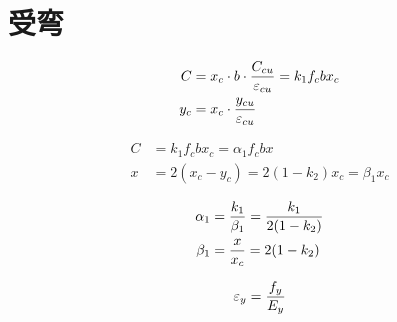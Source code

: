\begin{comment}
    \formDesc{基本组合}
    \begin{subequations}
        {\em 可变作用控制的情况:}
        \begin{equation}
            S_d = \gamma_GS_{Gk} + \gamma_{Q1}S_{Q1k} + \sum_{i = 2}^n\,\gamma_{Qi}\psi_{ci}S_{Qik}
        \end{equation}
        {\em 永久作用控制的情况:}
        \begin{equation}
            S_d = \gamma_GS_{Gk} + \sum_{i = 1}^n\,\gamma_{Qi}\psi_{ci}S_{Qik}
        \end{equation}
        \begin{description}\baselineskip=.8em
            \item{$S_{Gk}$、$\gamma_G$} 永久作用及其分项系数
            \item{$S_{Q1k}$、$\gamma_{Q1}$、$S_{Qik}$、$\gamma_{Qi}$}
        \end{description}
    \end{subequations}
    第一可变作用(最主要的可变作用)的效应、
\end{comment}

\section{受弯}

\begin{align}
C &= x_c\cdot b\cdot{C_{cu}\over{\varepsilon_{cu}}}=k_1f_cbx_c\\
 y_c &= x_c\cdot{y_{cu}\over{\varepsilon_{cu}}}
\end{align}

\begin{align}
C&=k_1f_cbx_c = \alpha_1f_cbx\\
x&=2(x_c - y_c) = 2(1-k_2)x_c = \beta_1x_c
\end{align}

\begin{align}
\alpha_1 &= {k_1\over\beta_1}= {k_1\over2(1-k_2)}\\
\beta_1 &= {x\over x_c} = 2(1-k_2)
\end{align}

\begin{align}
\varepsilon_y = {f_y\over E_y}
\end{align}

